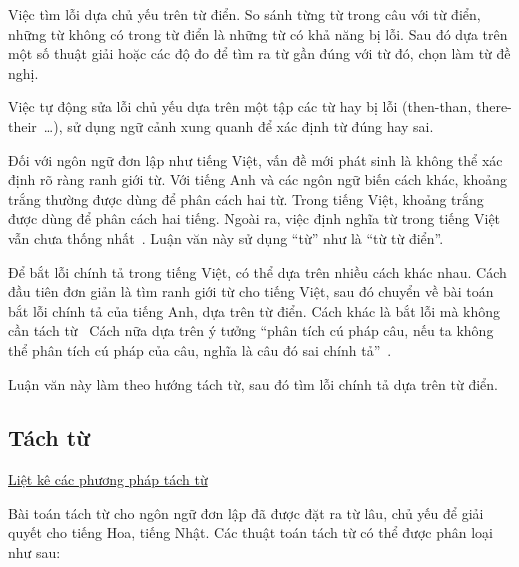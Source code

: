\documentclass[a4paper,oneside]{book} %
\newcommand{\note}[1]{\underline{#1}}
\theoremstyle{break}
\begin{document}
Việc tìm lỗi dựa chủ yếu trên từ điển. So sánh từng từ trong câu với từ điển, những từ
không có trong từ điển là những từ có khả năng bị lỗi. Sau đó dựa trên
một số thuật giải hoặc các độ đo để tìm ra từ gần đúng với từ đó, chọn làm
từ đề nghị.

Việc tự động sửa lỗi chủ yếu dựa trên một tập các từ hay bị lỗi (then-than,
there-their~\ldots), sử dụng ngữ cảnh xung quanh để xác định từ đúng
hay sai.

Đối với ngôn ngữ đơn lập như tiếng Việt, vấn đề mới phát sinh là không
thể xác định rõ ràng ranh giới từ. Với tiếng Anh và các ngôn ngữ biến
cách khác, khoảng trắng thường được dùng để phân cách hai từ. Trong tiếng Việt,
khoảng trắng được dùng để phân cách hai tiếng. Ngoài ra, việc định
nghĩa từ trong tiếng Việt vẫn chưa thống nhất~\cite{worddef}. Luận văn
này sử dụng ``từ'' như là ``từ từ điển''.  

Để bắt lỗi chính tả trong tiếng Việt, có thể dựa trên nhiều cách khác
nhau. Cách đầu tiên đơn giản là tìm ranh giới từ cho tiếng Việt, sau
đó chuyển về bài toán bắt lỗi chính tả của tiếng Anh, dựa trên từ
điển. Cách khác là bắt lỗi mà không cần tách từ~\cite{Tuoi}
Cách nữa dựa trên ý tưởng ``phân tích cú pháp câu, nếu ta không thể
phân tích cú pháp của câu, nghĩa là câu đó sai chính tả''~\cite{iccc}.

Luận văn này làm theo hướng tách từ, sau đó tìm lỗi chính tả dựa trên
từ điển.



\subsection{Tách từ}

\note{Liệt kê các phương pháp tách từ}

Bài toán tách từ cho ngôn ngữ đơn lập đã được đặt ra từ lâu, chủ yếu
để giải quyết cho tiếng Hoa, tiếng Nhật. Các thuật toán tách từ có thể
được phân loại như sau:
\end{document}
